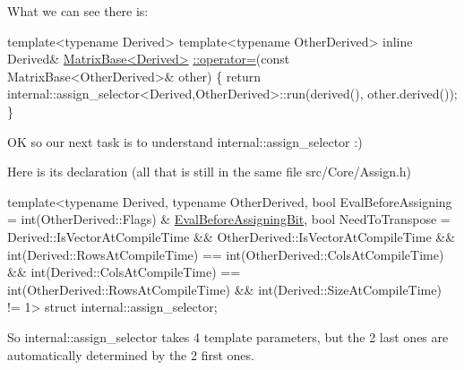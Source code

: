 What we can see there is\+: 
\begin{DoxyCode}
\textcolor{keyword}{template}<\textcolor{keyword}{typename} Derived>
\textcolor{keyword}{template}<\textcolor{keyword}{typename} OtherDerived>
\textcolor{keyword}{inline} Derived& \hyperlink{group___core___module_a706a4dd1ee54786e9210de1a4bf02600}{MatrixBase<Derived>}
\hyperlink{group___core___module_a706a4dd1ee54786e9210de1a4bf02600}{  ::operator=}(\textcolor{keyword}{const} MatrixBase<OtherDerived>& other)
\{
  \textcolor{keywordflow}{return} internal::assign\_selector<Derived,OtherDerived>::run(derived(), other.derived());
\}
\end{DoxyCode}


OK so our next task is to understand internal\+::assign\+\_\+selector \+:)

Here is its declaration (all that is still in the same file src/\+Core/\+Assign.\+h) 
\begin{DoxyCode}
\textcolor{keyword}{template}<\textcolor{keyword}{typename} Derived, \textcolor{keyword}{typename} OtherDerived,
         \textcolor{keywordtype}{bool} EvalBeforeAssigning = int(OtherDerived::Flags) & 
      \hyperlink{group__flags_ga0972b20dc004d13984e642b3bd12532e}{EvalBeforeAssigningBit},
         \textcolor{keywordtype}{bool} NeedToTranspose = Derived::IsVectorAtCompileTime
                && OtherDerived::IsVectorAtCompileTime
                && int(Derived::RowsAtCompileTime) == int(OtherDerived::ColsAtCompileTime)
                && int(Derived::ColsAtCompileTime) == int(OtherDerived::RowsAtCompileTime)
                && int(Derived::SizeAtCompileTime) != 1>
\textcolor{keyword}{struct }internal::assign\_selector;
\end{DoxyCode}


So internal\+::assign\+\_\+selector takes 4 template parameters, but the 2 last ones are automatically determined by the 2 first ones.

